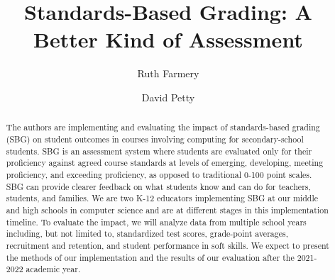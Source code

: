 \documentclass[sigconf]{acmart}
\begin{document}
\title{Standards-Based Grading: A Better Kind of Assessment}

\author{Ruth Farmery}

\author{David Petty}

\renewcommand{\shortauthors}{Farmery and Petty}

\begin{abstract}
The authors are implementing and evaluating the impact of standards-based grading (SBG) on student outcomes in courses involving computing for secondary-school students. SBG is an assessment system where students are evaluated only for their proficiency against agreed course standards at levels of emerging, developing, meeting proficiency, and exceeding proficiency, as opposed to traditional 0-100 point scales. SBG can provide clearer feedback on what students know and can do for teachers, students, and families. We are two K-12 educators implementing SBG at our middle and high schools in computer science and are at different stages in this implementation timeline. To evaluate the impact, we will analyze data from multiple school years including, but not limited to, standardized test scores, grade-point averages, recruitment and retention, and student performance in soft skills. We expect to present the methods of our implementation and the results of our evaluation after the 2021-2022 academic year.
\end{abstract}
\end{document}
